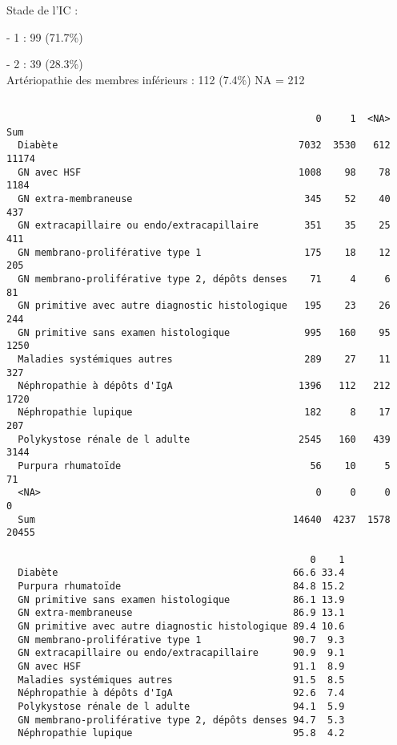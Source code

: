 \documentclass[11pt,a4paper]{article}\usepackage[]{graphicx}\usepackage[]{color}
\makeatletter
\newenvironment{kframe}{%
 \def\at@end@of@kframe{}%
 \ifinner\ifhmode%
  \def\at@end@of@kframe{\end{minipage}}%
  \begin{minipage}{\columnwidth}%
 \fi\fi%
 \def\FrameCommand##1{\hskip\@totalleftmargin \hskip-\fboxsep
 \colorbox{shadecolor}{##1}\hskip-\fboxsep
     \hskip-\linewidth \hskip-\@totalleftmargin \hskip\columnwidth}%
 \MakeFramed {\advance\hsize-\width
   \@totalleftmargin\z@ \linewidth\hsize
   \@setminipage}}%
 {\par\unskip\endMakeFramed%
 \at@end@of@kframe}
\newenvironment{knitrout}{}{} %
\makeatother
\begin{document}
Stade de l’IC :

- 1 : 99 (71.7\%)

- 2 : 39 (28.3\%)
~\\

Artériopathie des membres inférieurs : 112 (7.4\%) NA = 212

\begin{knitrout}
\color{fgcolor}\begin{kframe}
\begin{verbatim}
                                                 
                                                      0     1  <NA>   Sum
  Diabète                                          7032  3530   612 11174
  GN avec HSF                                      1008    98    78  1184
  GN extra-membraneuse                              345    52    40   437
  GN extracapillaire ou endo/extracapillaire        351    35    25   411
  GN membrano-proliférative type 1                  175    18    12   205
  GN membrano-proliférative type 2, dépôts denses    71     4     6    81
  GN primitive avec autre diagnostic histologique   195    23    26   244
  GN primitive sans examen histologique             995   160    95  1250
  Maladies systémiques autres                       289    27    11   327
  Néphropathie à dépôts d'IgA                      1396   112   212  1720
  Néphropathie lupique                              182     8    17   207
  Polykystose rénale de l adulte                   2545   160   439  3144
  Purpura rhumatoïde                                 56    10     5    71
  <NA>                                                0     0     0     0
  Sum                                             14640  4237  1578 20455
                                                 
                                                     0    1
  Diabète                                         66.6 33.4
  Purpura rhumatoïde                              84.8 15.2
  GN primitive sans examen histologique           86.1 13.9
  GN extra-membraneuse                            86.9 13.1
  GN primitive avec autre diagnostic histologique 89.4 10.6
  GN membrano-proliférative type 1                90.7  9.3
  GN extracapillaire ou endo/extracapillaire      90.9  9.1
  GN avec HSF                                     91.1  8.9
  Maladies systémiques autres                     91.5  8.5
  Néphropathie à dépôts d'IgA                     92.6  7.4
  Polykystose rénale de l adulte                  94.1  5.9
  GN membrano-proliférative type 2, dépôts denses 94.7  5.3
  Néphropathie lupique                            95.8  4.2
\end{verbatim}
\end{kframe}
\end{knitrout}
\end{document}
